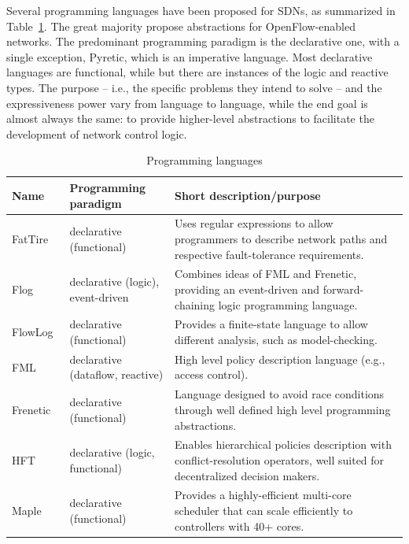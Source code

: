 Several programming languages have been proposed for SDNs, as summarized in Table~\ref{tab:programminglanguages}.
The great majority propose abstractions for OpenFlow-enabled networks.
The predominant programming paradigm is the declarative one, with a single exception, Pyretic, which is an imperative language. 
Most declarative languages are functional, while but there are instances of the logic and reactive types.
The purpose -- i.e., the specific problems they intend to solve -- and the expressiveness power vary from language to 
language, while the end goal is almost always the same: to provide higher-level abstractions to facilitate the 
development of network control logic.

{\renewcommand{\arraystretch}{1.4}
\begin{table}[!htp]
\caption{Programming languages}
\label{tab:programminglanguages}
\begin{center}
\footnotesize
\begin{tabularx}{\linewidth}{p{2cm}p{4cm}X}
\hline
\textbf{Name} & \textbf{Programming paradigm} & \textbf{Short description/purpose} \\\hline
FatTire~\cite{reitblatt2013}  & declarative (functional) & Uses regular expressions to allow programmers to describe network paths and respective fault-tolerance requirements. \\\hline
Flog~\cite{katta2012}  & declarative (logic), event-driven & Combines ideas of FML and Frenetic, providing an event-driven and forward-chaining logic programming language. \\\hline
FlowLog~\cite{nelson2014} & declarative (functional) & Provides a finite-state language to allow different analysis, such as model-checking.\\\hline
FML~\cite{hinrichs2009} & declarative (dataflow, reactive) & High level policy description language (e.g., access control).  \\\hline
Frenetic~\cite{foster2011} & declarative (functional) & Language designed to avoid race conditions through well defined high level programming abstractions.  \\\hline
HFT~\cite{ferguson2012}  & declarative (logic, functional) & Enables hierarchical policies description with conflict-resolution operators, well suited for decentralized decision makers. \\\hline
Maple~\cite{voellmy2013} & declarative (functional) & Provides a highly-efficient multi-core scheduler that can scale efficiently to controllers with 40+ cores. \\\hline

\end{tabularx}
\end{center}
\end{table}}
